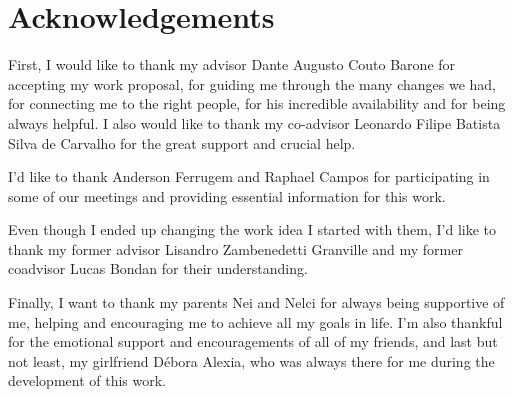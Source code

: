\chapter*{Acknowledgements}

First, I would like to thank my advisor Dante Augusto Couto Barone for accepting my work proposal, for guiding me through the many changes we had, for connecting me to the right people, for his incredible availability and for being always helpful. I also would like to thank my co-advisor Leonardo Filipe Batista Silva de Carvalho for the great support and crucial help. 

I'd like to thank Anderson Ferrugem and Raphael Campos for participating in some of our meetings and providing essential information for this work.

Even though I ended up changing the work idea I started with them, I'd like to thank my former advisor Lisandro Zambenedetti Granville and my former coadvisor Lucas Bondan for their understanding.

Finally, I want to thank my parents Nei and Nelci for always being supportive of me, helping and encouraging me to achieve all my goals in life. I'm also thankful for the emotional support and encouragements of all of my friends, and last but not least, my girlfriend Débora Alexia, who was always there for me during the development of this work.
\clearpage